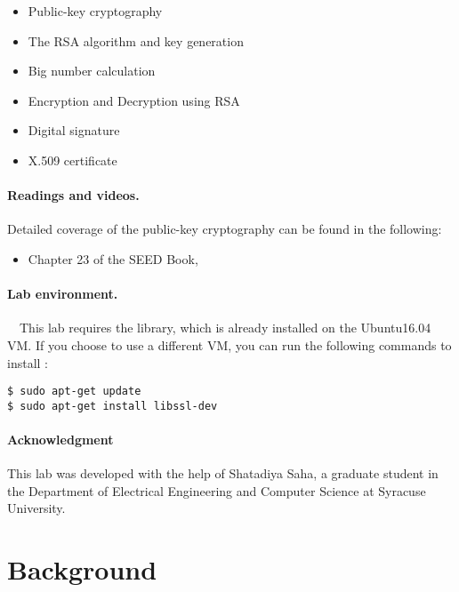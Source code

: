 \begin{itemize}[noitemsep]
\item Public-key cryptography
\item The RSA algorithm and key generation
\item Big number calculation
\item Encryption and Decryption using RSA 
\item Digital signature
\item X.509 certificate
\end{itemize}


\paragraph{Readings and videos.}
Detailed coverage of the public-key cryptography can be found in the following:

\begin{itemize}
\item Chapter 23 of the SEED Book, \seedbook
\end{itemize}


\paragraph{Lab environment.} \seedenvironment \ \
This lab requires the \openssl library, which is already
installed on the Ubuntu16.04 VM. If you choose to use 
a different VM, you can run the following commands to install \openssl:

\begin{lstlisting}
$ sudo apt-get update
$ sudo apt-get install libssl-dev
\end{lstlisting}
 

\paragraph{Acknowledgment} This lab was developed with the help of
Shatadiya Saha, a graduate student in the Department of
Electrical Engineering and Computer Science at Syracuse University.




\section{Background}


